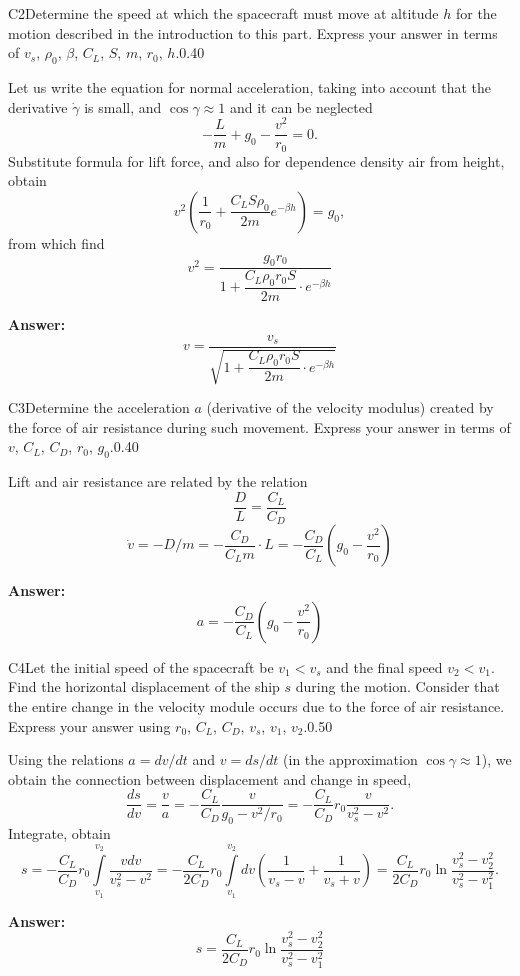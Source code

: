 \documentclass[11pt,a4paper]{article}
\begin{document}
\begin{solcard}{C2}{Determine the speed at which the spacecraft must move at altitude $h$ for the motion described in the introduction to this part. Express your answer in terms of $v_s$, $\rho_0$, $\beta$, $C_L$, $S$, $m$, $r_0$, $h$.}{0.40}

Let us write the equation for normal acceleration, taking into account that the derivative $\dot{\gamma}$ is small, and $\cos \gamma \approx 1$ and it can be neglected $$-\frac{L}{m}+g_0 -\frac{v^2}{r_0} = 0.$$Substitute formula for lift force, and also for dependence density air from height, obtain $$ v^2 \left( \frac{1}{r_0} + \frac{C_L S \rho_0}{2 m}e^{- \beta h}\right) = g_0, $$from which find $$v^2=\frac{g_0r_0}{1+\dfrac{C_L \rho_0 r_0 S}{2m}\cdot e^{-\beta h}}$$

\par\smallskip\noindent\textbf{Answer:} $$v= \frac{v_s}{\sqrt{1+\dfrac{C_L \rho_0 r_0 S}{2m}\cdot e^{-\beta h}} }$$
\end{solcard}

\begin{solcard}{C3}{Determine the acceleration $a$ (derivative of the velocity modulus) created by the force of air resistance during such movement. Express your answer in terms of $v$, $C_L$, $C_D$, $r_0$, $g_0$.}{0.40}

Lift and air resistance are related by the relation $$ \frac{D}{L} = \frac{C_L}{C_D} $$ $$\dot v=-D/m=-\dfrac{C_D}{C_Lm}\cdot L=-\dfrac{C_D}{C_L}\left(g_0-\dfrac{v^2}{r_0}\right)$$

\par\smallskip\noindent\textbf{Answer:} $$a=-\dfrac{C_D}{C_L}\left(g_0-\dfrac{v^2}{r_0}\right)$$
\end{solcard}

\begin{solcard}{C4}{Let the initial speed of the spacecraft be $v_1< v_s$ and the final speed $v_2 < v_1$. Find the horizontal displacement of the ship $s$ during the motion. Consider that the entire change in the velocity module occurs due to the force of air resistance. Express your answer using $r_0$, $C_L$, $C_D$, $v_s$, $v_1$, $v_2$.}{0.50}

Using the relations $a = dv/dt$ and $v = ds/dt$ (in the approximation $\cos \gamma \approx 1$), we obtain the connection between displacement and change in speed, $$ \frac{ds}{dv} = \frac{v}{a} = - \frac{C_L}{C_D} \frac{v}{g_0 - v^2/r_0} =  - \frac{C_L}{C_D} r_0 \frac{v}{v_s^2 - v^2}. $$Integrate, obtain $$ s = - \frac{C_L}{C_D} r_0 \int\limits_{v_1}^{v_2} \frac{vdv}{v_s^2 -v^2} = - \frac{C_L}{2C_D} r_0  \int\limits_{v_1}^{v_2} dv\left( \frac{1}{v_s - v} + \frac{1}{v_s + v}\right) = \frac{C_L}{2 C_D}r_0 \ln \frac{v_s^2 -v_2^2}{v_s^2 -v_1^2}. $$

\par\smallskip\noindent\textbf{Answer:} $$s=\dfrac{C_L}{2C_D}r_0\ln\dfrac{v_s^2-v_2^2}{v_s^2-v_1^2}$$
\end{solcard}
\end{document}

